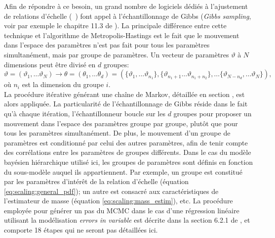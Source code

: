 Afin de répondre à ce besoin, un grand nombre de logiciels dédiés à l'ajustement de relations d'échelle (\eg\ \cite{sereno_bayesian_2016, mantz_gibbs_2016}) font appel à l'échantillonnage de Gibbs (\textit{Gibbs sampling}, voir par exemple le chapitre 11.3 de \cite{gelman_bayesian_2013}).
La principale différence entre cette technique et l'algorithme de Metropolis-Hastings est le fait que le mouvement dans l'espace des paramètres n'est pas fait pour tous les paramètres simultanément, mais par groupe de paramètres.
Un vecteur de paramètres $\vartheta$ à $N$ dimensions peut être divisé en $d$ groupes:
\begin{equation}
    \vartheta = (\vartheta_1, \dots \vartheta_N)
    \rightarrow \theta = (\theta_1, \dots \theta_d)
    = (\{\vartheta_1, \dots \vartheta_{n_1}\}, \{\vartheta_{n_1 + 1} \dots \vartheta_{n_1 + n_2}\}, \dots \{\vartheta_{N - n_d}, \dots \vartheta_N\}),
\end{equation}
où $n_i$ est la dimension du groupe $i$. \\
La procédure itérative générant une chaîne de Markov, détaillée en section , est alors appliquée.
La particularité de l'échantillonnage de Gibbs réside dans le fait qu'à chaque itération, l'échantillonneur boucle sur les $d$ groupes pour proposer un mouvement dans l'espace des paramètres groupe par groupe, plutôt que pour tous les paramètres simultanément.
De plus, le mouvement d'un groupe de paramètres est conditionné par celui des autres paramètres, afin de tenir compte des corrélations entre les paramètres de groupes différents.
Dans le cas du modèle bayésien hiérarchique utilisé ici, les groupes de paramètres sont définis en fonction du sous-modèle auquel ils appartiennent.
Par exemple, un groupe est constitué par les paramètres d'intérêt de la relation d'échelle (équation \ref{eq:scaling:general_pdf}); un autre est consacré aux caractéristiques de l'estimateur de masse (équation \ref{eq:scaling:mass_estim}), etc.
La procédure employée pour générer un pas du MCMC dans le cas d'une régression linéaire utilisant la modélisation \textit{errors in variable} est décrite dans la section 6.2.1 de \cite{kelly_aspects_2007}, et comporte 18 étapes qui ne seront pas détaillées ici.


